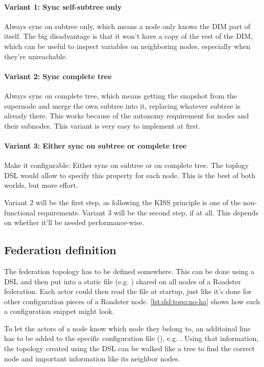 \paragraph{Variant 1: Sync self-subtree only}
Always sync on subtree only, which means a node only knows the DIM part of
itself. The big disadvantage is that it won't have a copy of the rest of the
DIM, which can be useful to inspect variables on neighboring nodes, especially
when they're unreachable.

\paragraph{Variant 2: Sync complete tree}\label{par:approach:dim:var2}
Always sync on complete tree, which means getting the snapshot from the
supernode and merge the own subtree into it, replacing whatever subtree is
already there. This works because of the autonomy requirement for nodes and
their subnodes. This variant is very easy to implement at first.

\paragraph{Variant 3: Either sync on subtree or complete tree}
Make it configurable: Either sync on subtree or on complete tree. The
toplogy DSL would allow to specify this property for each node. This is
the best of both worlds, but more effort.

Variant 2 will be the first step, as following the \gls{KISS} principle is one
of the non-functional requirements. Variant 3 will be the second step, if at
all. This depends on whether it'll be needed performance-wise.

\subsection{Federation definition}
The federation topology has to be defined somewhere. This can be done using a
\gls{DSL} and then put into a static file (e.g. ) shared
on all nodes of a Roadster federation. Each actor could then read the file at
startup, just like it's done for other configuration pieces of a Roadster node.
\autoref{lst:dsl:topo:no-ha} shows how such a configuration snippet might look.

To let the actors of a node know which node they belong to, an additoinal line
has to be added to the specific configuration file (), e.g.
. Using that information, the topology
created using the DSL can be walked like a tree to find the correct node and
important information like its neighbor nodes.

